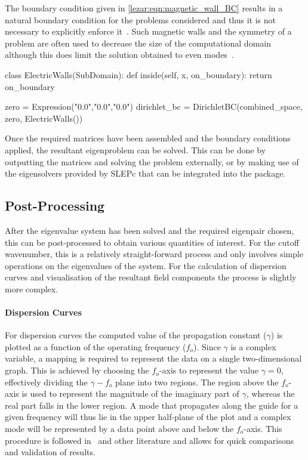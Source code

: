 The boundary condition given in \eqref{lezar:eqn:magnetic_wall_BC} results
in a natural boundary condition for the problems considered and thus
it is not necessary to explicitly enforce it~\cite{PelosiCoccioliSelleri1998}.  Such
magnetic walls and the symmetry of a problem are often used to
decrease the size of the computational domain although this does limit
the solution obtained to even modes~\cite{Jin2002}.

\begin{python}
class ElectricWalls(SubDomain):
    def inside(self, x, on_boundary):
        return on_boundary

zero = Expression("0.0","0.0","0.0")
dirichlet_bc = DirichletBC(combined_space, zero, ElectricWalls())
\end{python}

Once the required matrices have been assembled and the boundary
conditions applied, the resultant eigenproblem can be solved. This can
be done by outputting the matrices and solving the problem externally,
or by making use of the eigensolvers provided by SLEPc that can be
integrated into the \fenics{} package.

\subsection{Post-Processing}

After the eigenvalue system has been solved and the required eigenpair
chosen, this can be post-processed to obtain various quantities of
interest. For the cutoff wavenumber, this is
a relatively straight-forward process and only involves simple
operations on the eigenvalues of the system. For the calculation of
dispersion curves and visualisation of the resultant field components
the process is slightly more complex.

\paragraph{Dispersion Curves}

For dispersion curves the computed value of the propagation constant
($\gamma$) is plotted as a function of the operating frequency
($f_o$).  Since $\gamma$ is a complex variable, a mapping is required
to represent the data on a single two-dimensional graph. This is
achieved by choosing the $f_o$-axis to represent the value $\gamma =
0$, effectively dividing the {$\gamma-f_o$} plane into two
regions. The region above the $f_o$-axis is used to represent the
magnitude of the imaginary part of $\gamma$, whereas the real part
falls in the lower region. A mode that propagates along the guide for
a given frequency will thus lie in the upper half-plane of the plot
and a complex mode will be represented by a data point above and below
the $f_o$-axis.  This procedure is followed in~\cite{PelosiCoccioliSelleri1998} and
other literature and allows for quick comparisons and validation of
results.

